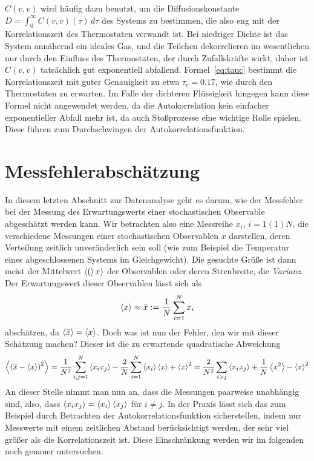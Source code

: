 $C(v,v)$ wird häufig dazu benutzt, um die Diffusionskonstante $D =
\int_0^{\infty} C(v,v)(\tau)\, d\tau$ des Systems zu bestimmen, die
also eng mit der Korrelationszeit des Thermostaten verwandt ist.  Bei
niedriger Dichte ist das System annähernd ein ideales Gas, und die
Teilchen dekorrelieren im wesentlichen nur durch den Einfluss des
Thermostaten, der durch Zufallskräfte wirkt, daher ist $C(v,v)$
tatsächlich gut exponentiell abfallend.  Formel~\eqref{eq:tauc}
bestimmt die Korrelationszeit mit guter Genauigkeit zu etwa
$\tau_c=0.17$, wie durch den Thermostaten zu erwarten. Im Falle der
dichteren Flüssigkeit hingegen kann diese Formel nicht angewendet
werden, da die Autokorrelation kein einfacher exponentieller Abfall
mehr ist, da auch Stoßprozesse eine wichtige Rolle spielen. Diese
führen zum Durchschwingen der Autokorrelationsfunktion.

\section{Messfehlerabschätzung}

In diesem letzten Abschnitt zur Datenanalyse geht es darum, wie der
Messfehler bei der Messung des Erwartungswerts einer stochastischen
Observable abgeschätzt werden kann. Wir betrachten also eine Messreihe
$x_i$, $i=1(1)N$, die verschiedene Messungen einer stochastischen
Observablen $x$ darstellen, deren Verteilung zeitlich unveränderlich
sein soll (wie zum Beispiel die Temperatur eines abgeschlossenen
Systems im Gleichgewicht). Die gesuchte Größe ist dann meist der
Mittelwert $\left\langle{(}\right\rangle x)$ der Observablen oder deren Streubreite, die
\emph{Varianz}. Der Erwartungswert dieser Observablen lässt sich als
\begin{equation}
  \label{eq:mean}
  \left\langle{x}\right\rangle \approx \bar{x} := \frac{1}{N}\sum_{i=1}^N x_i
\end{equation}
abschätzen, da $\left\langle{\bar{x}}\right\rangle = \left\langle{x}\right\rangle$. Doch was ist nun der
Fehler, den wir mit dieser Schätzung machen? Dieser ist die zu
erwartende quadratische Abweichung
\begin{equation}
  \left\langle{\left(\overline{x} - \left\langle{x}\right\rangle\right)^2}\right\rangle =
  \frac{1}{N^2}\sum_{i,j=1}^N \left\langle{x_ix_j}\right\rangle -
  \frac{2}{N}\sum_{i=1}^N \left\langle{x_i}\right\rangle\left\langle{x}\right\rangle + \left\langle{x}\right\rangle^2
  = \frac{2}{N^2}\sum_{i > j} \left\langle{x_ix_j}\right\rangle
  + \frac{1}{N}\left\langle{x^2}\right\rangle - \left\langle{x}\right\rangle^2
\end{equation}
An dieser Stelle nimmt man nun an, dass die Messungen paarweise
unabhängig sind, also, dass $\left\langle{x_ix_j}\right\rangle = \left\langle{x_i}\right\rangle\left\langle{x_j}\right\rangle$ für
$i\neq j$. In der Praxis lässt sich das zum Beispiel durch Betrachten
der Autokorrelationsfunktion sicherstellen, indem nur Messwerte mit
einem zeitlichen Abstand berücksichtigt werden, der sehr viel größer
als die Korrelationszeit ist. Diese Einschränkung werden wir im
folgenden noch genauer untersuchen.

